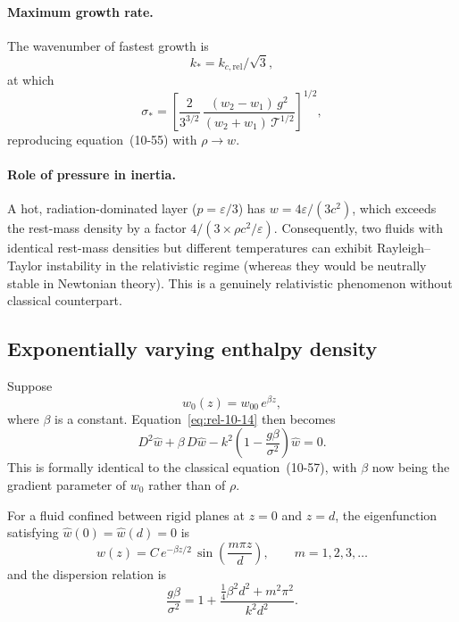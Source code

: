 \paragraph{Maximum growth rate.}
The wavenumber of fastest growth is
\begin{equation}
\label{eq:rel-10-25}
k_{*} = k_{c,\mathrm{rel}}/\sqrt{3},
\end{equation}
at which
\begin{equation}
\label{eq:rel-10-26}
\sigma_{*}
= \left[
  \frac{2}{3^{3/2}}\,
  \frac{(w_{2}-w_{1})\,g^{2}}{(w_{2}+w_{1})\,\mathcal{T}^{1/2}}
\right]^{1/2}\!,
\end{equation}
reproducing equation~(10-55) with $\rho\to w$.

\paragraph{Role of pressure in inertia.}
A hot, radiation-dominated layer ($p=\varepsilon/3$) has
$w = 4\varepsilon/(3c^{2})$, which exceeds the rest-mass density by a
factor $4/(3\times\rho c^{2}/\varepsilon)$.  Consequently, two fluids
with identical rest-mass densities but different temperatures can exhibit
Rayleigh--Taylor instability in the relativistic regime (whereas they
would be neutrally stable in Newtonian theory).  This is a genuinely
relativistic phenomenon without classical counterpart.

\subsection{Exponentially varying enthalpy density}
\label{sec:rel-92-exp}

Suppose
\begin{equation}
\label{eq:rel-10-27}
w_{0}(z) = w_{00}\,e^{\beta z},
\end{equation}
where $\beta$ is a constant.  Equation~\eqref{eq:rel-10-14} then
becomes
\begin{equation}
\label{eq:rel-10-28}
D^{2}\hat{w} + \beta\,D\hat{w}
- k^{2}\!\left(1 - \frac{g\beta}{\sigma^{2}}\right)\hat{w} = 0.
\end{equation}
This is formally identical to the classical equation~(10-57), with
$\beta$ now being the gradient parameter of $w_{0}$ rather than of
$\rho$.

For a fluid confined between rigid planes at $z=0$ and $z=d$, the
eigenfunction satisfying $\hat{w}(0)=\hat{w}(d)=0$ is
\begin{equation}
\label{eq:rel-10-29}
\hat{w}(z) = C\,e^{-\beta z/2}\,\sin\!\left(\frac{m\pi z}{d}\right),
\qquad m = 1, 2, 3, \ldots
\end{equation}
and the dispersion relation is
\begin{equation}
\label{eq:rel-10-30}
\frac{g\beta}{\sigma^{2}}
= 1 + \frac{\tfrac{1}{4}\beta^{2}d^{2}+m^{2}\pi^{2}}{k^{2}d^{2}}.
\end{equation}

